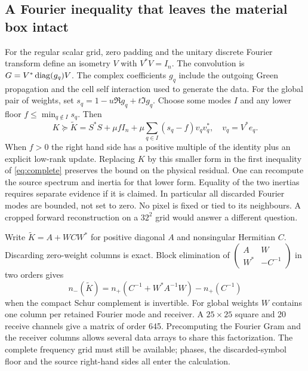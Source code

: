 \documentclass[anonymous,12pt]{iopjournal}
\theoremstyle{remark}\newtheorem{remark}[theorem]{Remark}
\numberwithin{equation}{section}
\begin{document}
\subsection{A Fourier inequality that leaves the material box intact}
For the regular scalar grid, zero padding and the unitary discrete Fourier transform define an isometry $V$ with $V^*V=I_n$. The convolution is $G=V^*\operatorname{diag}(g_q)V$. The complex coefficients $g_q$ include the outgoing Green propagation and the cell self interaction used to generate the data. For the global pair of weights, set $s_q=1-u\Re g_q+t\Im g_q$. Choose some modes $I$ and any lower floor $f\le\min_{q\notin I}s_q$. Then
\begin{equation}
 K\succeq \widetilde K=S^*S+\mu f I_n+
                  \mu\sum_{q\in I}(s_q-f)v_qv_q^*,\quad v_q=V^*e_q.
 \label{eq:fourfloor}
\end{equation}
When $f>0$ the right hand side has a positive multiple of the identity plus an explicit low-rank update. Replacing $K$ by this smaller form in the first inequality of \eqref{eq:complete} preserves the bound on the physical residual. One can recompute the source spectrum and inertia for that lower form. Equality of the two inertias requires separate evidence if it is claimed. In particular all discarded Fourier modes are bounded, not set to zero. No pixel is fixed or tied to its neighbours. A cropped forward reconstruction on a $32^2$ grid would answer a different question.

Write $\widetilde K=A+W C W^*$ for positive diagonal $A$ and nonsingular Hermitian $C$. Discarding zero-weight columns is exact. Block elimination of $\left(\begin{smallmatrix}A&W\\W^*&-C^{-1}\end{smallmatrix}\right)$ in two orders gives
\begin{equation}
 n_-(\widetilde K)=n_+(C^{-1}+W^*A^{-1}W)-n_+(C^{-1})\label{eq:smallin}
\end{equation}
when the compact Schur complement is invertible. For global weights $W$ contains one column per retained Fourier mode and receiver. A $25\times25$ square and 20 receive channels give a matrix of order 645. Precomputing the Fourier Gram and the receiver columns allows several data arrays to share this factorization. The complete frequency grid must still be available; phases, the discarded-symbol floor and the source right-hand sides all enter the calculation.
\end{document}

